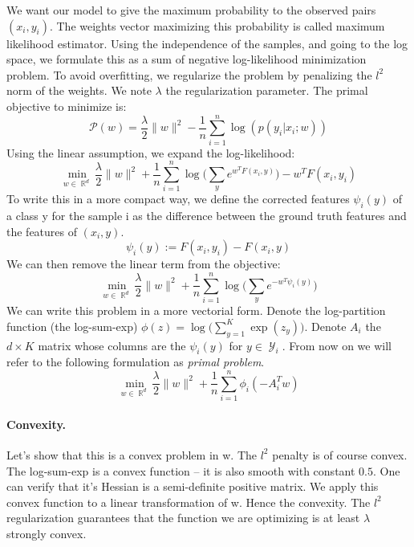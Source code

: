 \documentclass{article}
\DeclareMathOperator{\R}{\mathbb{R}}
\DeclareMathOperator{\1}{\mathbb{1}}
\DeclareMathOperator{\Y}{\mathcal{Y}}
\begin{document}
We want our model to give the maximum probability to the observed pairs $(x_i, y_i)$.
The weights vector maximizing this probability is called maximum likelihood estimator.
Using the independence of the samples, and going to the log space, we formulate this as a sum of negative log-likelihood minimization problem.
To avoid overfitting, we regularize the problem by penalizing the $l^2$ norm of the weights.
We note $\lambda$ the regularization parameter. The primal objective to minimize is:
\begin{equation*}
\mathscr P(w) = \frac{\lambda}{2}\|w\|^2 - \frac{1}{n}   \sum_{i=1}^{n} \log(p(y_i|x_i; w))	
\end{equation*}
Using the linear assumption, we expand the log-likelihood:
\begin{equation*}
	\min_{w\in\R^d} \frac{\lambda}{2}\|w\|^2 + \frac{1}{n}   \sum_{i=1}^{n}  \log \big (\sum_y e^{w^TF(x_i, y)} \big ) - w^TF(x_i, y_i)	
\end{equation*}
To write this in a more compact way, we define the corrected features $\psi_i(y)$ of a class y for the sample i as the difference between the ground truth features and the features of $(x_i, y)$.
\begin{equation*}
	\psi_i(y) := F(x_i, y_i) - F(x_i, y)
\end{equation*}
We can then remove the linear term from the objective:
\begin{equation*}
	\min_{w\in\R^d} \frac{\lambda}{2}\|w\|^2 + \frac{1}{n}   \sum_{i=1}^{n}  \log \big (\sum_y e^{- w^T\psi_i(y)} \big )
\end{equation*}
We can write this problem in a more vectorial form.
Denote the log-partition function (the log-sum-exp) $\phi(z) = \log \big(\sum_{y=1}^K \exp(z_y)\big)$. 
Denote $A_i$ the $d \times K$ matrix whose columns are the $\psi_i(y)$ for $y \in \Y_i$.
From now on we will refer to the following formulation as \textit{primal problem}.
\begin{equation}
	\label{primal problem}
	\min_{w\in\R^d}  \frac{\lambda}{2}\|w\|^2 + \frac{1}{n}   \sum_{i=1}^{n} \phi_i(-A_i^Tw)
\end{equation} 

\paragraph{Convexity.}
Let's show that this is a convex problem in w.
The $l^2$ penalty is of course convex.
The log-sum-exp is a convex function -- it is also smooth with constant $0.5$.
One can verify that it's Hessian is a semi-definite positive matrix.
We apply this convex function to a linear transformation of w.
Hence the convexity.
The $l^2$ regularization guarantees that the function we are optimizing is at least $\lambda$ strongly convex. 
\end{document}
